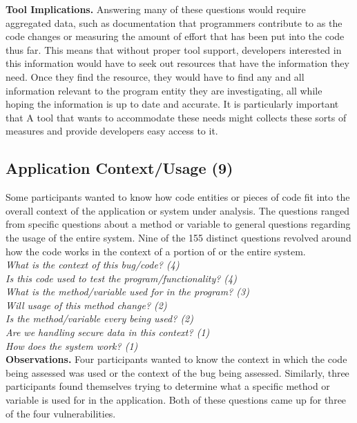 \documentclass[conference]{IEEEtran}
\begin{document}
\noindent\textbf{Tool Implications.}
Answering many of these questions would require aggregated data, such as documentation that programmers contribute to as the code changes or measuring the amount of effort that has been put into the code thus far.
This means that without proper tool support, developers interested in this information would have to seek out resources that have the information they need.
Once they find the resource, they would have to find any and all information relevant to the program entity they are investigating, all while hoping the information is up to date and accurate.
It is particularly important that  
A tool that wants to accommodate these needs might collects these sorts of measures and provide developers easy access to it.



\noindent\subsection{\textbf{Application Context/Usage (9)}}\label{acu}


Some participants wanted to know how code entities or pieces of code fit into the overall context of the application or system under analysis. 
The questions ranged from specific questions about a method or variable to general questions regarding the usage of the entire system. 
Nine of the 155 distinct questions revolved around how the code works in the context of a portion of or the entire system.
\\

\noindent\emph{What is the context of this bug/code? (4)} \\
\emph{Is this code used to test the program/functionality? (4)} \\
\emph{What is the method/variable used for in the program? (3)} \\
\emph{Will usage of this method change? (2)} \\
\emph{Is the method/variable every being used? (2)} \\
\emph{Are we handling secure data in this context? (1)} \\
\emph{How does the system work? (1)} \\



\noindent\textbf{Observations.}
Four participants wanted to know the context in which the code being assessed was used or the context of the bug being assessed.
Similarly, three participants found themselves trying to determine what a specific method or variable is used for in the application.
Both of these questions came up for three of the four vulnerabilities.
\end{document}
